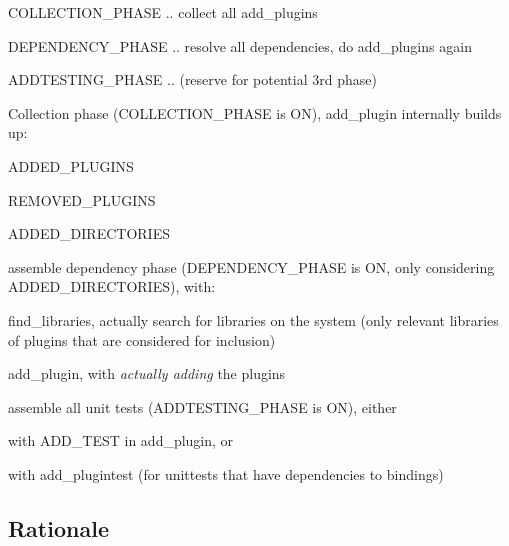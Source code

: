\begin{DoxyItemize}
\item {\ttfamily C\+O\+L\+L\+E\+C\+T\+I\+O\+N\+\_\+\+P\+H\+A\+SE} .. collect all {\ttfamily add\+\_\+plugins}
\item {\ttfamily D\+E\+P\+E\+N\+D\+E\+N\+C\+Y\+\_\+\+P\+H\+A\+SE} .. resolve all dependencies, do {\ttfamily add\+\_\+plugins} again
\item {\ttfamily A\+D\+D\+T\+E\+S\+T\+I\+N\+G\+\_\+\+P\+H\+A\+SE} .. (reserve for potential 3rd phase)
\end{DoxyItemize}
\begin{DoxyEnumerate}
\item Collection phase ({\ttfamily C\+O\+L\+L\+E\+C\+T\+I\+O\+N\+\_\+\+P\+H\+A\+SE} is {\ttfamily ON}), add\+\_\+plugin internally builds up\+:
\begin{DoxyItemize}
\item {\ttfamily A\+D\+D\+E\+D\+\_\+\+P\+L\+U\+G\+I\+NS}
\item {\ttfamily R\+E\+M\+O\+V\+E\+D\+\_\+\+P\+L\+U\+G\+I\+NS}
\item {\ttfamily A\+D\+D\+E\+D\+\_\+\+D\+I\+R\+E\+C\+T\+O\+R\+I\+ES}
\end{DoxyItemize}
\item assemble dependency phase ({\ttfamily D\+E\+P\+E\+N\+D\+E\+N\+C\+Y\+\_\+\+P\+H\+A\+SE} is {\ttfamily ON}, only considering {\ttfamily A\+D\+D\+E\+D\+\_\+\+D\+I\+R\+E\+C\+T\+O\+R\+I\+ES}), with\+:
\begin{DoxyItemize}
\item {\ttfamily find\+\_\+libraries}, actually search for libraries on the system (only relevant libraries of plugins that are considered for inclusion)
\item {\ttfamily add\+\_\+plugin}, with {\itshape actually adding} the plugins
\end{DoxyItemize}
\item assemble all unit tests ({\ttfamily A\+D\+D\+T\+E\+S\+T\+I\+N\+G\+\_\+\+P\+H\+A\+SE} is {\ttfamily ON}), either
\begin{DoxyItemize}
\item with {\ttfamily A\+D\+D\+\_\+\+T\+E\+ST} in {\ttfamily add\+\_\+plugin}, or
\item with {\ttfamily add\+\_\+plugintest} (for unittests that have dependencies to bindings)
\end{DoxyItemize}
\end{DoxyEnumerate}

\subsection*{Rationale}

